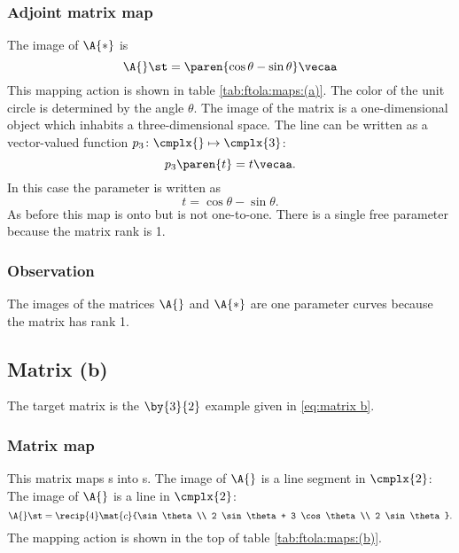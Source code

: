 \subsubsection{Adjoint matrix map} 
The image of $\A{*}$ is
\begin{equation}
  \A{} \st = \paren{ \cos \theta - \sin \theta } \vecaa
\end{equation}
This mapping action is shown in table \eqref{tab:ftola:maps:(a)}. The color of the unit circle is determined by the angle $\theta$. The image of the matrix is a one-dimensional object which inhabits a three-dimensional space.
The line can be written as a vector-valued function $p_{3}\colon \cmplx{} \mapsto \cmplx{3}$:
\begin{equation}
  p_{3}\paren{ t } = t \vecaa.
  \label{ftola:image:(a)}
\end{equation}
In this case the parameter is written as
\begin{equation}
  t = \cos \theta - \sin \theta .
\end{equation}
As before this map is onto but is not one-to-one. There is a single free parameter because the matrix rank is 1.

\subsubsection{Observation} The images of the matrices $\A{}$ and $\A{*}$ are one parameter curves because the matrix has rank 1.


\subsection{Matrix (b)}
The target matrix is the $\by{3}{2}$ example given in \eqref{eq:matrix b}.

\subsubsection{Matrix map} 
This matrix maps \vv s into \vvv s. The image of $\A{}$ is a line segment in $\cmplx{2}$:
The image of $\A{}$ is a line in $\cmplx{2}$:
\begin{equation}
  \A{} \st = \recip{4} \mat{c}{\sin \theta \\ 2 \sin \theta + 3 \cos \theta \\ 2 \sin \theta} .
\end{equation}
The mapping action is shown in the top of table \eqref{tab:ftola:maps:(b)}. 

